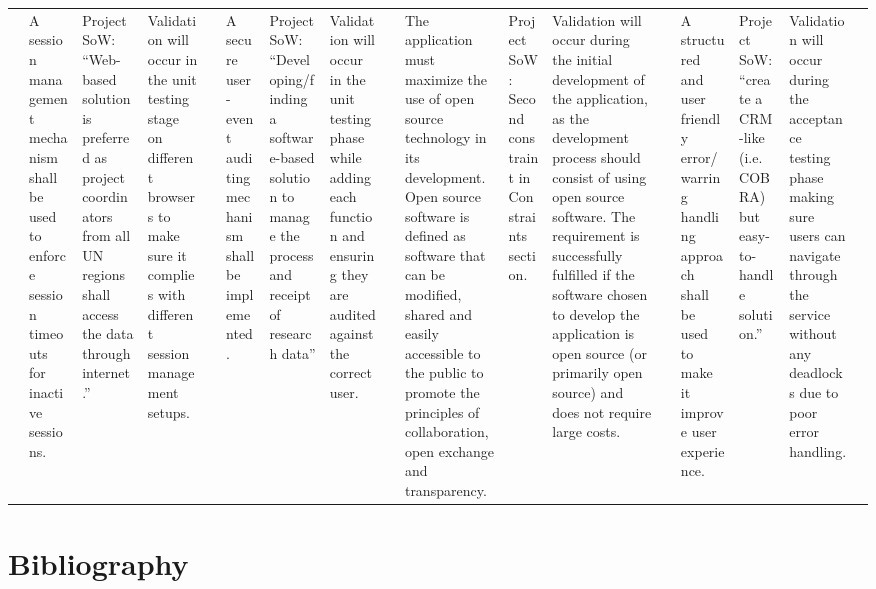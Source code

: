 \documentclass[11pt]{article}
\begin{document}
\begin{longtable}{| C{1cm} | L{4.33cm} | L{4.33cm} | L{4.34cm} |}
        &
        A session management mechanism shall be used to enforce session timeouts for inactive sessions. \cite{security} &
        Project SoW: “Web-based solution is preferred as project coordinators from all UN regions shall access the data through internet.” &
        Validation will occur in the unit testing stage on different browsers to make sure it complies with different session management setups.  &

        &
        A secure user-event auditing mechanism shall be implemented. \cite{security} &
        Project SoW: “Developing/finding a software-based solution to manage the process and receipt of research data” &
        Validation will occur in the unit testing phase while adding each function and ensuring  they are audited against the correct user.  &
        \hline


        \parbox[t]{2mm}{} &
        The application must maximize the use of open source technology in its development. Open source software is defined as software that can be modified, shared and easily accessible to the public to promote the principles of collaboration, open exchange and transparency. \cite{open} &
        Project SoW: Second constraint in Constraints section.  &
        Validation will occur during the initial development of the application, as the development process should consist of using open source software. The requirement is successfully fulfilled if the software chosen to develop the application is open source (or primarily open source) and does not require large costs.  &

        &
        A structured and user friendly error/warring handling approach shall be used to make it improve user experience. \cite{security} &
        Project SoW: “create a CRM-like (i.e. COBRA) but easy-to-handle solution.” &
        Validation will occur during the acceptance testing phase making sure users can navigate through the service without any deadlocks due to poor error handling.  &
        \hline

\end{longtable}


\newpage
\section{Bibliography}
\printbibliography
\end{document}
